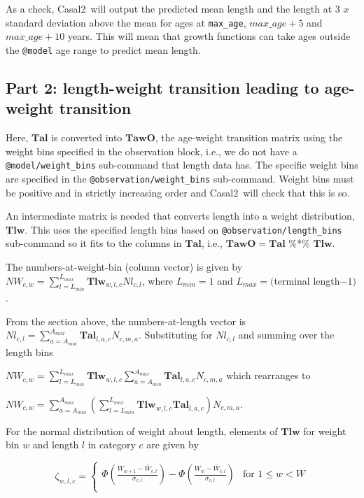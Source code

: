 \documentclass[a4paper,11pt,twoside,pdftex,draft]{article}
\newcommand{\CNAME}{Casal2}
\begin{document}
As a check, \CNAME~will output the predicted mean length and the length at 3 $x$ standard deviation above the mean for ages at  \texttt{max\_age}, $max\_age + 5$ and $max\_age + 10$ years. This will mean that growth functions can take ages outside the \texttt{@model} age range to predict mean length. 


\subsection{Part 2: length-weight transition leading to age-weight transition}
Here, $\mathbf{Tal}$ is converted into $\mathbf{TawO}$, the age-weight transition matrix  using the weight bins specified in the observation block, i.e., we do not have a
\texttt{@model/weight\_bins} sub-command that length data has. The specific weight bins are specified in the \texttt{@observation/weight\_bins} sub-command.
 Weight bins must be positive and in strictly increasing order and \CNAME~will check that this is so.

An intermediate matrix is needed that converts length into a weight distribution, $\mathbf{Tlw}$. This uses the specified length bins based on \texttt{@observation/length\_bins} sub-command so it fits to the columns in $\mathbf{Tal}$, i.e., $\mathbf{TawO} =\mathbf{Tal} $ \%*\% $ \mathbf{Tlw} $.

The numbers-at-weight-bin (column vector) is given by $NW_{c,w} = \sum_{l=L_{min}}^{L_{max}}  \mathbf{Tlw}_{w,l,c} Nl_{c,l}$, where $L_{min} = 1$ and $L_{max} = ($terminal length$ - 1)$.

From the section above, the numbers-at-length vector is $Nl_{c,l} = \sum_{a=A_{min}}^{A_{max}}  \mathbf{Tal}_{l,a,c} N_{c,m,a}$. Substituting for $Nl_{c,l}$ and summing over the length bins

$NW_{c,w} = \sum_{l=L_{min}}^{L_{max}}  \mathbf{Tlw}_{w,l,c} \sum_{a=A_{min}}^{A_{max}}  \mathbf{Tal}_{l,a,c} N_{c,m,a}$ which rearranges to 

$NW_{c,w} = \sum_{a=A_{min}}^{A_{max}} \left( \sum_{l=L_{min}}^{L_{max}}  \mathbf{Tlw}_{w,l,c}  \mathbf{Tal}_{l,a,c}\right) N_{c,m,a}$. 

For the normal distribution of weight about length, 
elements of $\mathbf{Tlw}$ for weight bin $w$ and length $l$ in category $c$ are given by

\begin{equation}
\zeta_{w,l,c} =
\begin{cases}

\Phi\left( \frac{W_{w+1} - \bar W_{c,l}   }{\sigma_{c,l}} \right)   - \Phi\left( \frac{W_{w} - \bar W_{c,l}   }{\sigma_{c,l}} \right) & \text{for } 1 \leq w < W \\

\end{cases}
\end{equation}
\end{document}
